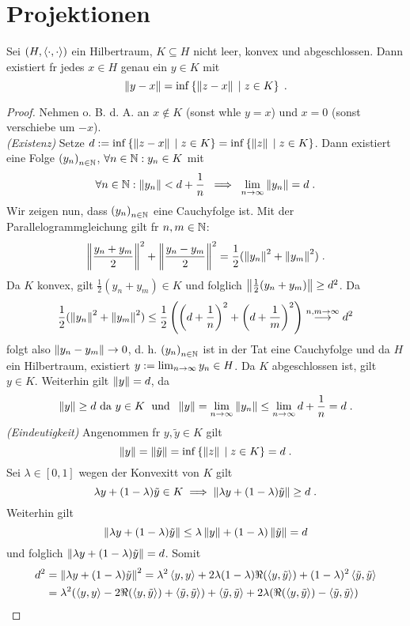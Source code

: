 \section{Projektionen}
\begin{theorem}
	Sei \((H, \left\langle\cdot, \cdot\right\rangle)\) ein Hilbertraum, \(K \subseteq H\) nicht leer, konvex und abgeschlossen. Dann existiert f\us r jedes \(x \in H \) genau ein \(y \in K\) mit 
	\[\left\lVert y-x\right\rVert = \inf\left\{ \left\lVert z-x\right\rVert\;\vert\; z \in K\right\} \;.\]
	\label{Projektionssatz}
\end{theorem}
\begin{proof}
	Nehmen o. B. d. A. an \(x\not\in K\) (sonst w\as hle \(y = x\)) und \(x = 0\) (sonst verschiebe um \(-x\)).\\
	\textit{(Existenz)} Setze \(d:= \inf\left\{\left\lVert z-x\right\rVert \;\vert\; z\in K\right\} = \inf\left\{\left\lVert z\right\rVert\;\vert\; z\in K\right\} \). Dann existiert eine Folge \(\left (y_n\right )_{n\in \mathbb{N}}\), \(\forall n \in \mathbb{N}: y_n \in K\) mit
	\[\forall n \in \mathbb{N}: \left\lVert y_n\right\rVert < d + \frac{1}{n} \;\implies\; \lim_{n \to\infty} \left\lVert y_n\right\rVert = d\;.\]
	Wir zeigen nun, dass \(\left (y_n\right )_{n\in \mathbb{N}}\) eine Cauchyfolge ist. Mit der Parallelogrammgleichung gilt f\us r \(n,m\in\mathbb{N}\):
	\[\left\lVert\frac{y_n + y_m}{2}\right\rVert^2 + \left\lVert\frac{y_n - y_m}{2}\right\rVert^2 = \frac{1}{2} (\left\lVert y_n\right\rVert^2 + \left\lVert y_m\right\rVert^2)\;.\]
	Da \(K\) konvex, gilt \(\frac{1}{2}(y_n + y_m)\in K\) und folglich \(\left\lVert\frac{1}{2} (y_n + y_m)\right\rVert \geq d^2\). Da 
	\[\frac{1}{2} (\left\lVert y_n\right\rVert^2 + \left\lVert y_m\right\rVert^2) \leq \frac{1}{2}\left(\left(d+\frac{1}{n}\right)^2 + \left(d+\frac{1}{m}\right)^2\right) \overset{n,m\to \infty}{\longrightarrow} d^2 \]
	folgt also \(\left\lVert y_n - y_m\right\rVert\to 0\), d. h. \(\left (y_n\right )_{n\in \mathbb{N}}\) ist in der Tat eine Cauchyfolge und da $H$ ein Hilbertraum, existiert \(y:=\lim_{n \to \infty} y_n \in H\). Da $K$ abgeschlossen ist, gilt \(y\in K\). Weiterhin gilt \(\left\lVert y\right\rVert = d\), da
	\[\left\lVert y\right\rVert \geq d \text{ da } y\in K \;\text{ und }\; \left\lVert y\right\rVert = \lim_{n \to\infty} \left\lVert y_n\right\rVert \leq \lim_{n \to\infty} d+\frac{1}{n} = d\;.\]
	\textit{(Eindeutigkeit)} Angenommen f\us r \(y, \tilde y \in K\) gilt
	\[\left\lVert y\right\rVert = \left\lVert\tilde y\right\rVert = \inf\left\{\left\lVert z\right\rVert \;\vert\; z \in K\right\} = d\;.\]
	Sei \(\lambda \in [0,1]\) wegen der Konvexit\as t von $K$ gilt 
	\[\lambda y + (1-\lambda) \tilde y \in K \implies \left\lVert\lambda y + (1-\lambda) \tilde y\right\rVert \geq d\;.\] 
	Weiterhin gilt 
	\[\left\lVert\lambda y + (1-\lambda) \tilde y\right\rVert \leq \lambda \left\lVert y\right\rVert + (1-\lambda) \left\lVert\tilde y\right\rVert = d \]
	und folglich \(\left\lVert\lambda y + (1-\lambda) \tilde y\right\rVert = d\). Somit 
	\begin{align*} 
	d^2 &= \norm{\lambda y + (1-\lambda) \tilde y}^2 = \lambda^2 \ip{y,y}  + 2\lambda (1-\lambda) \Re(\ip{y,\tilde y}) + (1-\lambda)^2 \ip{\tilde y, \tilde y} \\ &=\lambda^2(\ip{y,y} -2 \Re(\ip{y,\tilde y}) + \ip{\tilde y, \tilde y}) + \ip{\tilde y, \tilde y} + 2 \lambda(\Re(\ip{y,\tilde y})-\ip{\tilde y, \tilde y})\\ 

\end{align*}
\end{proof}
